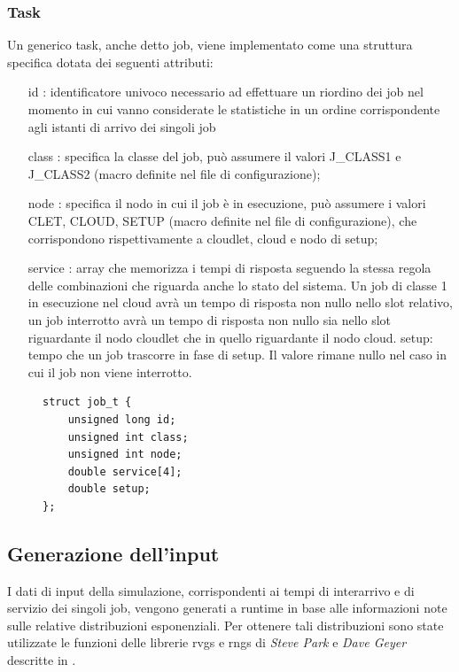 \subsubsection{Task}
Un generico task, anche detto job, viene implementato come una struttura
specifica dotata dei seguenti attributi: 
\begin{itemize}
\item[id]: identificatore univoco necessario ad effettuare un riordino dei job
nel momento in cui vanno considerate le statistiche in un ordine corrispondente
agli istanti di arrivo dei singoli job
\item[class]: specifica la classe del job, può assumere il valori J\_CLASS1 e
J\_CLASS2 (macro definite nel file di configurazione); 
\item[node]: specifica il nodo in cui il job è in esecuzione, può assumere i
valori CLET, CLOUD, SETUP (macro definite nel file di configurazione), che
corrispondono rispettivamente a cloudlet, cloud e nodo di setup; 
\item[service]: array che memorizza i tempi di risposta seguendo la stessa regola
delle combinazioni che riguarda anche lo stato del sistema. Un job di classe 1
in esecuzione nel cloud avrà un tempo di risposta non nullo nello slot relativo,
un job interrotto avrà un tempo di risposta non nullo sia nello slot riguardante
il nodo cloudlet che in quello riguardante il nodo cloud.  setup: tempo che un
job trascorre in fase di setup. Il valore rimane nullo nel caso in cui il job
non viene interrotto.  
\end{itemize}
\begin{figure}[!h]
\begin{lstlisting}[title=basic.h]
struct job_t {
    unsigned long id;
    unsigned int class;
    unsigned int node;
    double service[4];
    double setup;
};
\end{lstlisting}
\end{figure}
%
%
\subsection{Generazione dell'input}
I dati di input della simulazione, corrispondenti ai tempi di interarrivo e di
servizio dei singoli job, vengono generati a runtime in base alle informazioni
note sulle relative distribuzioni esponenziali. Per ottenere tali distribuzioni
sono state utilizzate le funzioni delle librerie rvgs e rngs di \emph{Steve
Park} e \emph{Dave Geyer} descritte in \cite{leemis}.

